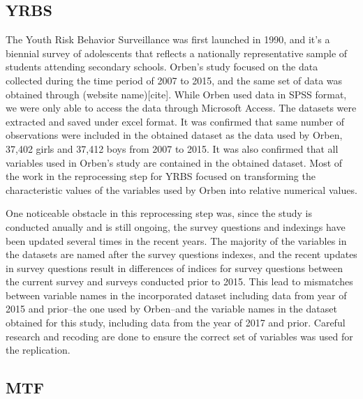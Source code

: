 \documentclass[12pt,twoside]{reedthesis}
\begin{document}
  \subsection{YRBS}\label{yrbs}
  
  \par 
  
  The Youth Risk Behavior Surveillance was first launched in 1990, and
  it's a biennial survey of adolescents that reflects a nationally
  representative sample of students attending secondary schools. Orben's
  study focused on the data collected during the time period of 2007 to
  2015, and the same set of data was obtained through (website
  name){[}cite{]}. While Orben used data in SPSS format, we were only able
  to access the data through Microsoft Access. The datasets were extracted
  and saved under excel format. It was confirmed that same number of
  observations were included in the obtained dataset as the data used by
  Orben, 37,402 girls and 37,412 boys from 2007 to 2015. It was also
  confirmed that all variables used in Orben's study are contained in the
  obtained dataset. Most of the work in the reprocessing step for YRBS
  focused on transforming the characteristic values of the variables used
  by Orben into relative numerical values.
  
  \par 
  
  One noticeable obstacle in this reprocessing step was, since the study
  is conducted anually and is still ongoing, the survey questions and
  indexings have been updated several times in the recent years. The
  majority of the variables in the datasets are named after the survey
  questions indexes, and the recent updates in survey questions result in
  differences of indices for survey questions between the current survey
  and surveys conducted prior to 2015. This lead to mismatches between
  variable names in the incorporated dataset including data from year of
  2015 and prior--the one used by Orben--and the variable names in the
  dataset obtained for this study, including data from the year of 2017
  and prior. Careful research and recoding are done to ensure the correct
  set of variables was used for the replication.
  
  \subsection{MTF}\label{mtf}
  
  \par 
  
\end{document}
